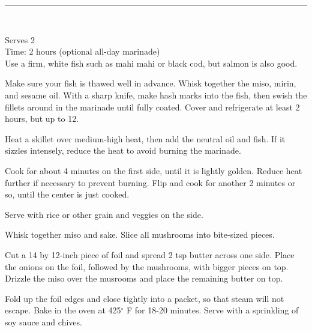 \documentclass{recipe-2mk}
\begin{document}
\begin{minipage}[c][.95\textheight][t]{0.62\textwidth}
    \rule{\textwidth}{2.5pt}\\

    \begin{headnotes}
        Serves 2\\
        Time: 2 hours (optional all-day marinade)\\
        Use a firm, white fish such as mahi mahi or black cod, but salmon is also good.\\
    \end{headnotes}

    \begin{directions}
        \item Make sure your fish is thawed well in advance. Whisk together the miso, mirin, and sesame oil. With a sharp knife, make hash marks into the fish, then swish the fillets around in the marinade until fully coated. Cover and refrigerate at least 2 hours, but up to 12.
        \item Heat a skillet over medium-high heat, then add the neutral oil and fish. If it sizzles intensely, reduce the heat to avoid burning the marinade.
        \item Cook for about 4 minutes on the first side, until it is lightly golden. Reduce heat further if necessary to prevent burning. Flip and cook for another 2 minutes or so, until the center is just cooked.
        \item Serve with rice or other grain and veggies on the side.
    \end{directions}
    \begin{directions}
        \item Whisk together miso and sake. Slice all mushrooms into bite-sized pieces. 
        \item Cut a 14 by 12-inch piece of foil and spread 2 tsp butter across one side. Place the onions on the foil, followed by the mushrooms, with bigger pieces on top. Drizzle the miso over the musrooms and place the remaining butter on top.
        \item Fold up the foil edges and close tightly into a packet, so that steam will not escape. Bake in the oven at 425$^{\circ}$ F for 18-20 minutes. Serve with a sprinkling of soy sauce and chives.
    \end{directions}
    
    \vfill
    \\

\end{minipage}
\end{document}
